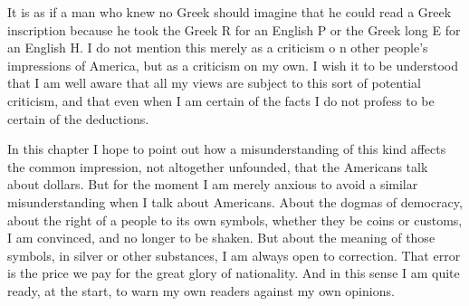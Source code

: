 \documentclass{book}
\begin{document}
It is as if a man who knew no Greek should imagine that he could read a Greek inscription because he took the Greek R for an English P or the Greek long E for an English H. I do not mention this merely as a criticism o n other people’s impressions of America, but as a criticism on my own. I wish it to be understood that I am well aware that all my views are subject to this sort of potential criticism, and that even when I am certain of the facts I do not profess to be certain of the deductions.

In this chapter I hope to point out how a misunderstanding of this kind affects the common impression, not altogether unfounded, that the Americans talk about dollars. But for the moment I am merely anxious to avoid a similar misunderstanding when I talk about Americans. About the dogmas of democracy, about the right of a people to its own symbols, whether they be coins or customs, I am convinced, and no longer to be shaken. But about the meaning of those symbols, in silver or other substances, I am always open to correction. That error is the price we pay for the great glory of nationality. And in this sense I am quite ready, at the start, to warn my own readers against my own opinions.
\end{document}

